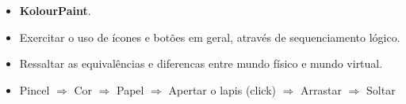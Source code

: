 \begin{itemize}
	\item \textbf{KolourPaint}.
	\item Exercitar o uso de ícones e botões em geral, através de sequenciamento lógico.
	\item Ressaltar as equivalências e diferencas entre mundo físico e mundo virtual.
	\item Pincel $\Rightarrow$ Cor $\Rightarrow$ Papel $\Rightarrow$ Apertar o lapis (click) $\Rightarrow$ Arrastar $\Rightarrow$ Soltar
\end{itemize}